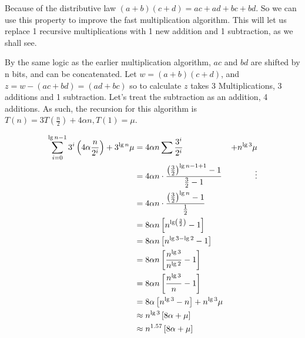 \documentclass[english, 10pt]{article}
\begin{document}
Because of the distributive law $(a+b)(c+d) = ac + ad + bc + bd$. So we can use this property to improve the fast multiplication algorithm.
This will let us replace 1 recursive multiplications with 1 new addition and 1 subtraction, as we shall see.



By the same logic as the earlier multiplication algorithm, $ac$ and $bd$ are
shifted by n bits, and can be concatenated.  Let $w=(a+b)(c+d)$, and $z = w
-(ac + bd) = (ad+bc)$ so to calculate $z$ takes 3 Multiplications, 3 additions
and 1 subtraction. Let's treat the subtraction as an addition, 4 additions.
As such, the recursion for this algorithm is $T(n) = 3T\left( \frac{n}{2} \right)+4\alpha n, T(1) = \mu$.

\begin{align*}
    \sum_{i=0}^{\lg n-1} 3^i \left( 4\alpha \frac{n}{2^i} \right) + 3^{\lg n}\mu &= 4\alpha n \sum \frac{3^i}{2^i} &+n^{\lg 3}\mu \\
    &= 4\alpha n \cdot \frac{{\left(\frac{3}{2} \right)}^{\lg n -1 +1}-1}{\frac{3}{2}-1} &\vdots\\
    &= 4\alpha n \cdot \frac{{\left(\frac{3}{2} \right)}^{\lg n }-1}{\frac{1}{2}} \\
    &= 8\alpha n \left[ n^{\lg \left( \frac{3}{2} \right)}-1 \right]\\
    &= 8\alpha n \left[ n^{\lg 3 - \lg 2}-1 \right]\\
    &= 8\alpha n \left[ \frac{n^{\lg 3}}{n^{\lg 2}}-1 \right]\\
    &= 8\alpha n \left[ \frac{n^{\lg 3}}{n}-1 \right]\\
    &= 8\alpha \left[ {n^{\lg 3}} -n \right] + n^{\lg 3}\mu\\
    &\approx {n^{\lg 3}}\left[ 8\alpha +\mu \right] \\
    &\approx {n^{1.57}}\left[ 8\alpha +\mu \right] \\
\end{align*}
\end{document}
